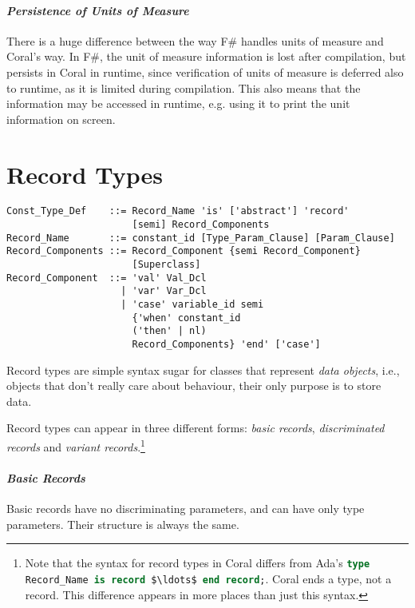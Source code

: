 \paragraph{\em Persistence of Units of Measure}
There is a huge difference between the way F\# handles units of measure and Coral's way. In F\#, the unit of measure information is lost after compilation, but persists in Coral in runtime, since verification of units of measure is deferred also to runtime, as it is limited during compilation. This also means that the information may be accessed in runtime, e.g. using it to print the unit information on screen.






\section{Record Types}
\label{sec:record-types}

\syntax\begin{lstlisting}
Const_Type_Def    ::= Record_Name 'is' ['abstract'] 'record'
                      [semi] Record_Components
Record_Name       ::= constant_id [Type_Param_Clause] [Param_Clause]
Record_Components ::= Record_Component {semi Record_Component}
                      [Superclass]
Record_Component  ::= 'val' Val_Dcl
                    | 'var' Var_Dcl
                    | 'case' variable_id semi 
                      {'when' constant_id 
                      ('then' | nl) 
                      Record_Components} 'end' ['case']
\end{lstlisting}

Record types are simple syntax sugar for classes that represent {\em data objects}, i.e., objects that don't really care about behaviour, their only purpose is to store data. 

Record types can appear in three different forms: {\em basic records}, {\em discriminated records} and {\em variant records}.\footnote{Note that the syntax for record types in Coral differs from Ada's \lstinline[language=Ada]!type Record_Name is record $\ldots$ end record;!. Coral ends a type, not a record. This difference appears in more places than just this syntax.}

\paragraph{\em Basic Records}
Basic records have no discriminating parameters, and can have only type parameters. Their structure is always the same. 

